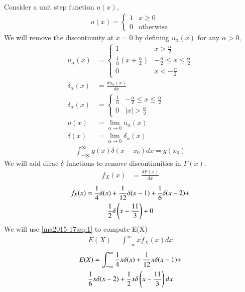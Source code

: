 
Consider a unit step function $u(x)$,
\begin{align}
u(x) = 
    \begin{cases}
        1 & x \geq 0 \\
        0 & \text{otherwise}
    \end{cases}
\end{align}
We will remove the discontinuity at $x=0$ by defining $u_{\alpha}(x)$ for any $\alpha > 0$,
\begin{align}
u_{\alpha}(x) &= 
    \begin{cases}
        1 & x > \frac{\alpha}{2} \\
        \frac{1}{\alpha}(x + \frac{\alpha}{2}) & -\frac{\alpha}{2} \leq x \leq \frac{\alpha}{2} \\
        0 & x < -\frac{\alpha}{2}
    \end{cases}\\
\delta_{\alpha}(x) &= \frac{du_{\alpha}(x)}{dx}\\
\delta_{\alpha}(x) &=
    \begin{cases}
        \frac{1}{\alpha} & -\frac{\alpha}{2} \leq x \leq \frac{\alpha}{2} \\
        0 & |x| > \frac{\alpha}{2}
    \end{cases}\\
u(x) &= \lim_{\alpha \to 0} u_{\alpha}(x)\\
\delta (x) &= \lim_{\alpha \to 0} \delta_{\alpha}(x)
\end{align}
\begin{align}
    \int_{-\infty}^{\infty}g(x)\delta(x-x_0)dx = g(x_0) \label{ma2015-17:eq:1}
\end{align}
We will add dirac $\delta$ functions to remove discontinuities in $F(x)$.
\begin{align}
    f_{X}(x) &= \frac{dF(x)}{dx}
\end{align}
\begin{multline}
    f_{X}(x) = \frac{1}{4}\delta(x) + \frac{1}{12}\delta(x - 1) + \frac{1}{6}\delta(x-2) +\\ \frac{1}{2}\delta\left(x-\frac{11}{3}\right) + 0
\end{multline}
We will use \eqref{ma2015-17:eq:1} to compute E(X)
\begin{align}
    E(X) = \int_{-\infty}^{\infty}xf_X(x)dx
\end{align}
\begin{multline}
    E(X) = \int_{-\infty}^{\infty}\frac{1}{4}x\delta(x) + \frac{1}{12}x\delta(x - 1) +\\ \frac{1}{6}x\delta(x-2) + \frac{1}{2}x\delta\left(x-\frac{11}{3}\right)dx
\end{multline}

